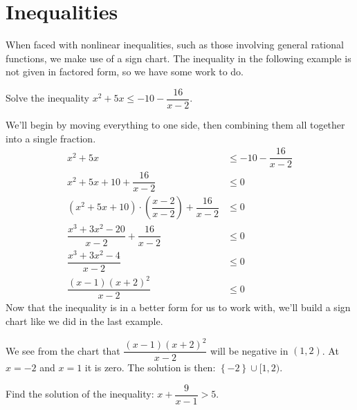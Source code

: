 \documentclass{ximera}
\begin{document}
\section{Inequalities}
When faced with nonlinear inequalities, such as those involving general rational functions, we make use of a sign chart.
The inequality in the following example is not given in factored form, so we have some work to do.
\begin{example}
	Solve the inequality $\displaystyle x^2 + 5x \leq -10 -\dfrac{16}{x-2}$.
	\begin{explanation}
		We'll begin by moving everything to one side, then combining them all together into a single fraction.
		\begin{align*}
			x^2 + 5x &\leq -10 -\dfrac{16}{x-2}\\
			x^2 + 5x +10 +\dfrac{16}{x-2} &\leq 0\\
			\left(x^2+5x+10\right) \cdot \left(\dfrac{x-2}{x-2}\right) +\dfrac{16}{x-2} &\leq 0\\
			\dfrac{x^3+3x^2-20}{x-2} + \dfrac{16}{x-2} &\leq 0\\
			\dfrac{x^3+3x^2-4}{x-2} &\leq 0\\
			\dfrac{(x-1)(x+2)^2}{x-2} &\leq 0
		\end{align*}
		Now that the inequality is in a better form for us to work with, we'll build a sign chart like we did in the last example.


		We see from the chart that $\displaystyle \dfrac{(x-1)(x+2)^2}{x-2}$ will be negative in $(1,2)$.  At $x=-2$ and $x=1$ it is zero.
		The solution is then: $\left\{ -2\right\} \cup [ 1, 2 )$.
	\end{explanation}
\end{example}


\begin{problem}
	Find the solution of the inequality: $\displaystyle x + \dfrac{9}{x-1} > 5$.
	\begin{multipleChoice}
		\choice{$[1,\infty)$}
		\choice{$\{1\} \cup [2,\infty)$}
	\end{multipleChoice}
\end{problem}
\end{document}

